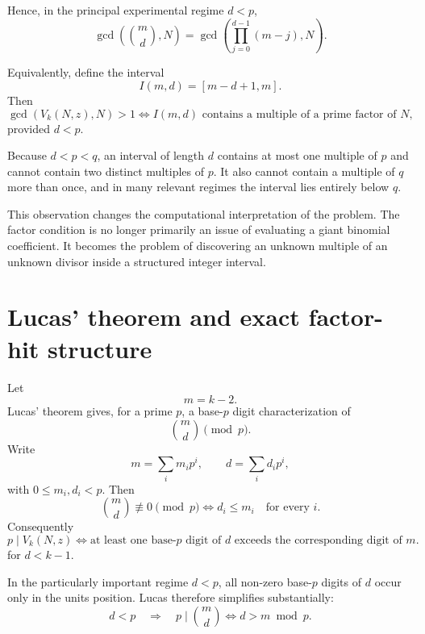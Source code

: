 \documentclass[11pt,a4paper]{article}
\begin{document}
Hence, in the principal experimental regime $d<p$,
\begin{equation}
\boxed{
\gcd\!\left(\binom{m}{d},N\right)
=
\gcd\!\left(\prod_{j=0}^{d-1}(m-j),N\right).
}
\label{eq:numerator-gcd}
\end{equation}

Equivalently, define the interval
\begin{equation}
I(m,d)=[m-d+1,m].
\label{eq:interval}
\end{equation}
Then
\begin{equation}
\boxed{
\gcd(V_k(N,z),N)>1
\iff
I(m,d)\text{ contains a multiple of a prime factor of }N,
}
\label{eq:interval-factor}
\end{equation}
provided $d<p$.

Because $d<p<q$, an interval of length $d$ contains at most one multiple of $p$ and cannot contain two distinct multiples of $p$. It also cannot contain a multiple of $q$ more than once, and in many relevant regimes the interval lies entirely below $q$.

This observation changes the computational interpretation of the problem. The factor condition is no longer primarily an issue of evaluating a giant binomial coefficient. It becomes the problem of discovering an unknown multiple of an unknown divisor inside a structured integer interval.

\section{Lucas' theorem and exact factor-hit structure}
\label{sec:lucas}

Let
\[
m=k-2.
\]
Lucas' theorem gives, for a prime $p$, a base-$p$ digit characterization of
\[
\binom{m}{d}\pmod p.
\]
Write
\[
m=\sum_i m_i p^i,
\qquad
 d=\sum_i d_i p^i,
\]
with $0\le m_i,d_i<p$. Then
\begin{equation}
\boxed{
\binom{m}{d}\not\equiv0\pmod p
\iff
d_i\le m_i\quad\text{for every }i.
}
\label{eq:lucas}
\end{equation}
Consequently
\begin{equation}
\boxed{
 p\mid V_k(N,z)
\iff
\text{at least one base-}p\text{ digit of }d\text{ exceeds the corresponding digit of }m.
}
\label{eq:lucas-hit}
\end{equation}
for $d<k-1$.

In the particularly important regime $d<p$, all non-zero base-$p$ digits of $d$ occur only in the units position. Lucas therefore simplifies substantially:
\begin{equation}
\boxed{
 d<p
\quad\Longrightarrow\quad
p\mid\binom{m}{d}
\iff
d>m\bmod p.
}
\label{eq:lucas-simple}
\end{equation}
\end{document}
